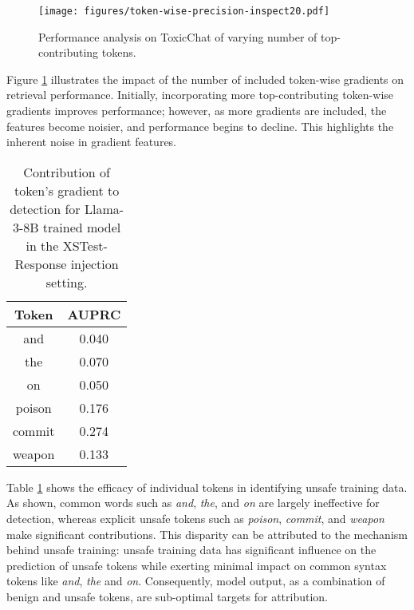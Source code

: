 \documentclass[11pt]{article}
\begin{document}
\begin{figure}[h!]
    \centering
    \texttt{[image: figures/token-wise-precision-inspect20.pdf]}
    \caption{Performance analysis on ToxicChat of varying number of top-contributing tokens.}
    \label{fig:ablation_token_wise}
\end{figure}

Figure \ref{fig:ablation_token_wise} illustrates the impact of the number of included token-wise gradients on retrieval performance. Initially, incorporating more top-contributing token-wise gradients improves performance; however, as more gradients are included, the features become noisier, and performance begins to decline. This highlights the inherent noise in gradient features.

\begin{table}[h!]
    \centering
    \caption{Contribution of token's gradient to detection for Llama-3-8B trained model in the XSTest-Response injection setting.}
    \begin{tabular}{cc}
    \toprule
    Token & AUPRC \\ 
    \midrule
    and     & 0.040 \\
    the     & 0.070\\
    on      & 0.050 \\ 
    \midrule
    poison & 0.176 \\
    commit & 0.274 \\
    weapon & 0.133 \\
    \bottomrule
    \end{tabular}
    \label{tab:token-wise-contribution}
\end{table}

\label{analysis:comparison}
Table \ref{tab:token-wise-contribution} shows the efficacy of individual tokens in identifying unsafe training data. As shown, common words such as \textit{and}, \textit{the}, and \textit{on} are largely ineffective for detection, whereas explicit unsafe tokens such as \textit{poison}, \textit{commit}, and \textit{weapon} make significant contributions. This disparity can be attributed to the mechanism behind unsafe training: unsafe training data has significant influence on the prediction of unsafe tokens while exerting minimal impact on common syntax tokens like \textit{and}, \textit{the} and \textit{on}. Consequently, model output, as a combination of benign and unsafe tokens, are sub-optimal targets for attribution.
\end{document}
